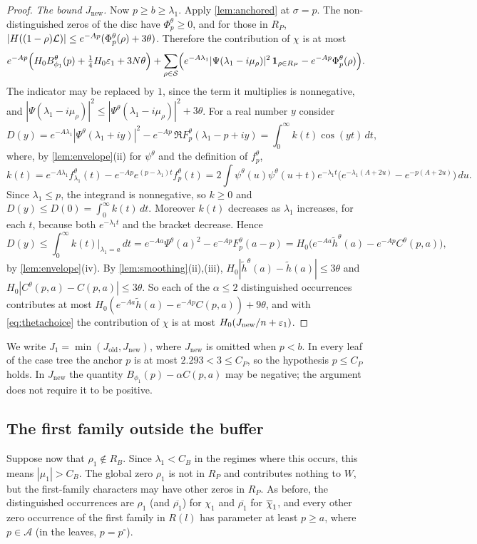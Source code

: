 \begin{proof}
\emph{The bound $J_{\mathrm{new}}$.} Now $p\ge b\ge\lambda_1$. Apply \cref{lem:anchored} at
$\sigma=p$. The non-distinguished zeros of the disc have $\Phi^\theta_p\ge0$, and for those in $R_P$,
$|H((1-\rho)\mathcal{L})|\le e^{-Ap}(\Phi^\theta_p(\rho)+3\theta)$. Therefore the contribution of $\chi$ is at
most
\[
  e^{-Ap}\Bigl(H_0B^\theta_{\phi_1}(p)+\tfrac14H_0\varepsilon_1+3N\theta\Bigr)
  +\sum_{\rho\in\mathcal{S}}\Bigl(e^{-A\lambda_1}|\Psi(\lambda_1-i\mu_\rho)|^2\,\mathbf{1}_{\rho\in R_P}-e^{-Ap}\Phi^\theta_p(\rho)\Bigr).
\]
The indicator may be replaced by $1$, since the term it multiplies is nonnegative, and
$|\Psi(\lambda_1-i\mu_\rho)|^2\le|\Psi^\theta(\lambda_1-i\mu_\rho)|^2+3\theta$. For a real number $y$ consider
\[
  D(y)=e^{-A\lambda_1}|\Psi^\theta(\lambda_1+iy)|^2-e^{-Ap}\,\Re F^\theta_p(\lambda_1-p+iy)
  =\int_0^\infty k(t)\cos(yt)\,dt,
\]
where, by \cref{lem:envelope}(ii) for $\psi^\theta$ and the definition of $f^\theta_p$,
\[
  k(t)=e^{-A\lambda_1}f^\theta_{\lambda_1}(t)-e^{-Ap}e^{(p-\lambda_1)t}f^\theta_p(t)
  =2\int\psi^\theta(u)\psi^\theta(u+t)e^{-\lambda_1t}\bigl(e^{-\lambda_1(A+2u)}-e^{-p(A+2u)}\bigr)\,du .
\]
Since $\lambda_1\le p$, the integrand is nonnegative, so $k\ge0$ and $D(y)\le D(0)=\int_0^\infty
k(t)\,dt$. Moreover $k(t)$ decreases as $\lambda_1$ increases, for each $t$, because both
$e^{-\lambda_1t}$ and the bracket decrease. Hence
\[
  D(y)\le\int_0^\infty k(t)\big|_{\lambda_1=a}\,dt=e^{-Aa}\Psi^\theta(a)^2-e^{-Ap}F^\theta_p(a-p)
  =H_0\bigl(e^{-Aa}\tilde h^\theta(a)-e^{-Ap}C^\theta(p,a)\bigr),
\]
by \cref{lem:envelope}(iv). By \cref{lem:smoothing}(ii),(iii), $H_0|\tilde h^\theta(a)-\tilde h(a)|\le3\theta$ and
$H_0|C^\theta(p,a)-C(p,a)|\le3\theta$. So each of the $\alpha\le2$ distinguished occurrences contributes at
most $H_0(e^{-Aa}\tilde h(a)-e^{-Ap}C(p,a))+9\theta$, and with \eqref{eq:thetachoice} the contribution of $\chi$ is
at most $H_0(J_{\mathrm{new}}/n+\varepsilon_1)$.
\end{proof}

We write $J_1=\min(J_{\mathrm{old}},J_{\mathrm{new}})$, where $J_{\mathrm{new}}$ is omitted when
$p<b$. In every leaf of the case tree the anchor $p$ is at most $2.293<3\le C_P$, so the hypothesis
$p\le C_P$ holds. In $J_{\mathrm{new}}$ the quantity $B_{\phi_1}(p)-\alpha C(p,a)$ may be negative; the
argument does not require it to be positive.

\subsection{The first family outside the buffer}\label{subsec:firstoutside}
Suppose now that $\rho_1\notin R_B$. Since $\lambda_1<C_B$ in the regimes where this occurs,
this means $|\mu_1|>C_B$. The global zero $\rho_1$ is not in $R_P$ and contributes nothing to $W$,
but the first-family characters may have other zeros in $R_P$. As before, the distinguished
occurrences are $\rho_1$ (and $\overline{\rho_1}$) for $\chi_1$ and $\overline{\rho_1}$ for $\overline{\chi}_1$, and
every other zero occurrence of the first family in $R(l)$ has parameter at least $p\ge a$, where $p\in\mathcal A$
(in the leaves, $p=p^\circ$).

